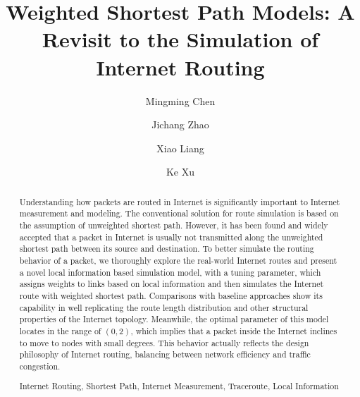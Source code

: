 \documentclass[a4paper]{llncs}
\newcommand{\keywords}[1]{\par\addvspace\baselineskip
\noindent\keywordname\enspace\ignorespaces#1}
\begin{document}
\mainmatter  
\title{Weighted Shortest Path Models: A Revisit to the Simulation of Internet Routing}


\author{Mingming Chen \and Jichang Zhao \and Xiao Liang \and Ke Xu}



\maketitle


\begin{abstract}
Understanding how packets are routed in Internet is significantly important to Internet measurement and modeling. The conventional solution for route simulation is based on the assumption of unweighted shortest path. However, it has been found and widely accepted that a packet in Internet is usually not transmitted along the unweighted shortest path between its source and destination. To better simulate the routing behavior of a packet, we thoroughly explore the real-world Internet routes and present a novel local information based simulation model, with a tuning parameter, which assigns weights to links based on local information and then simulates the Internet route with weighted shortest path. Comparisons with baseline approaches show its capability in well replicating the route length distribution and other structural properties of the Internet topology. Meanwhile, the optimal parameter of this model locates in the range of $(0,2)$, which implies that a packet inside the Internet inclines to move to nodes with small degrees. This behavior actually reflects the design philosophy of Internet routing, balancing between network efficiency and traffic congestion.

\keywords{Internet Routing, Shortest Path, Internet Measurement, Traceroute, Local Information}
\end{abstract}
\end{document}
